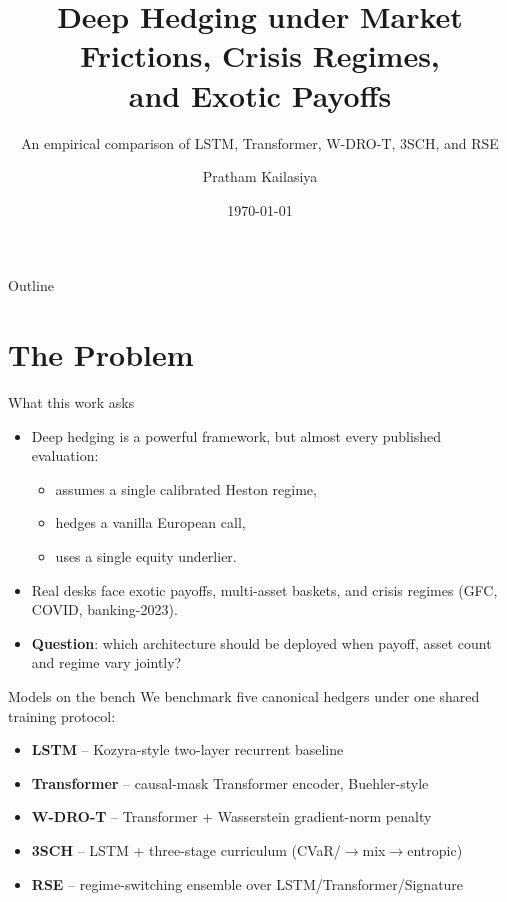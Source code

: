 \documentclass[aspectratio=169,10pt]{beamer}
\title{Deep Hedging under Market Frictions, Crisis Regimes,\\and Exotic Payoffs}
\subtitle{An empirical comparison of LSTM, Transformer, W-DRO-T, 3SCH, and RSE}
\author{Pratham Kailasiya}
\institute{IIT Roorkee}
\date{\today}
\begin{document}
\maketitle

\begin{frame}{Outline}
\tableofcontents
\end{frame}

\section{The Problem}

\begin{frame}{What this work asks}
\begin{itemize}
\item Deep hedging \citep{buehler2019deep} is a powerful framework, but
  almost every published evaluation:
  \begin{itemize}
    \item assumes a single calibrated Heston regime,
    \item hedges a vanilla European call,
    \item uses a single equity underlier.
  \end{itemize}
\item Real desks face exotic payoffs, multi-asset baskets, and crisis
  regimes (GFC, COVID, banking-2023).
\item \textbf{Question}: which architecture should be deployed when
  payoff, asset count and regime vary jointly?
\end{itemize}
\end{frame}

\begin{frame}{Models on the bench}
We benchmark five canonical hedgers under one shared training protocol:
\vspace{1mm}
\begin{itemize}
\item \textbf{LSTM} -- Kozyra-style two-layer recurrent baseline
\item \textbf{Transformer} -- causal-mask Transformer encoder, Buehler-style
\item \textbf{W-DRO-T} -- Transformer + Wasserstein gradient-norm penalty
\item \textbf{3SCH} -- LSTM + three-stage curriculum (CVaR/$\to$mix$\to$entropic)
\item \textbf{RSE} -- regime-switching ensemble over LSTM/Transformer/Signature
\end{itemize}
\end{frame}
\end{document}
